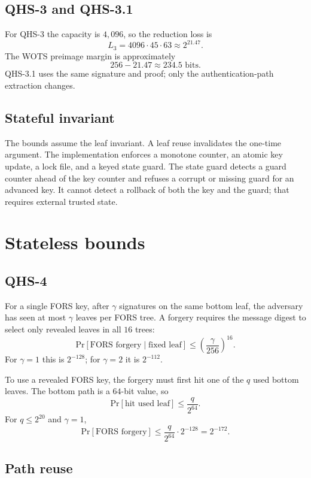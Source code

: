 \documentclass[11pt,a4paper]{article}
\theoremstyle{remark}
\newcommand{\Prb}{\mathrm{Pr}}
\begin{document}
\subsection{QHS-3 and QHS-3.1}

For QHS-3 the capacity is \(4{,}096\), so the reduction loss is
\[
L_3=4096\cdot45\cdot63\approx 2^{21.47}.
\]
The WOTS preimage margin is approximately
\[
256-21.47\approx 234.5\text{ bits}.
\]
QHS-3.1 uses the same signature and proof; only the authentication-path
extraction changes.

\subsection{Stateful invariant}

The bounds assume the leaf invariant. A leaf reuse invalidates the one-time
argument. The implementation enforces a monotone counter, an atomic key update,
a lock file, and a keyed state guard. The state guard detects a guard counter
ahead of the key counter and refuses a corrupt or missing guard for an advanced
key. It cannot detect a rollback of both the key and the guard; that requires
external trusted state.

\section{Stateless bounds}

\subsection{QHS-4}

For a single FORS key, after \(\gamma\) signatures on the same bottom leaf, the
adversary has seen at most \(\gamma\) leaves per FORS tree. A forgery requires
the message digest to select only revealed leaves in all \(16\) trees:
\[
\Prb[\text{FORS forgery}\mid \text{fixed leaf}]
\le
\left(\frac{\gamma}{256}\right)^{16}.
\]
For \(\gamma=1\) this is \(2^{-128}\); for \(\gamma=2\) it is \(2^{-112}\).

To use a revealed FORS key, the forgery must first hit one of the \(q\) used
bottom leaves. The bottom path is a \(64\)-bit value, so
\[
\Prb[\text{hit used leaf}]
\le
\frac{q}{2^{64}}.
\]
For \(q\le 2^{20}\) and \(\gamma=1\),
\[
\Prb[\text{FORS forgery}]
\le
\frac{q}{2^{64}}\cdot 2^{-128}
=
2^{-172}.
\]

\subsection{Path reuse}
\end{document}
